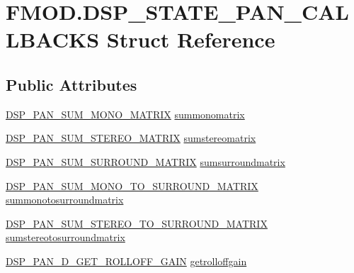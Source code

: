 \hypertarget{struct_f_m_o_d_1_1_d_s_p___s_t_a_t_e___p_a_n___c_a_l_l_b_a_c_k_s}{}\section{F\+M\+O\+D.\+D\+S\+P\+\_\+\+S\+T\+A\+T\+E\+\_\+\+P\+A\+N\+\_\+\+C\+A\+L\+L\+B\+A\+C\+KS Struct Reference}
\label{struct_f_m_o_d_1_1_d_s_p___s_t_a_t_e___p_a_n___c_a_l_l_b_a_c_k_s}
\subsection*{Public Attributes}
\begin{DoxyCompactItemize}
\item 
\hyperlink{namespace_f_m_o_d_af0cf7d431580d7f008accba401bd67be}{D\+S\+P\+\_\+\+P\+A\+N\+\_\+\+S\+U\+M\+\_\+\+M\+O\+N\+O\+\_\+\+M\+A\+T\+R\+IX} \hyperlink{struct_f_m_o_d_1_1_d_s_p___s_t_a_t_e___p_a_n___c_a_l_l_b_a_c_k_s_a159690b42e72855ed3ef3e6c2071f1cf}{summonomatrix}
\item 
\hyperlink{namespace_f_m_o_d_ac397f0f8014a6625c3810a9af4b4b9e7}{D\+S\+P\+\_\+\+P\+A\+N\+\_\+\+S\+U\+M\+\_\+\+S\+T\+E\+R\+E\+O\+\_\+\+M\+A\+T\+R\+IX} \hyperlink{struct_f_m_o_d_1_1_d_s_p___s_t_a_t_e___p_a_n___c_a_l_l_b_a_c_k_s_ace804227c9336d37481df37928d825c9}{sumstereomatrix}
\item 
\hyperlink{namespace_f_m_o_d_a9dda121ba9ef7b93f94aae821fafc709}{D\+S\+P\+\_\+\+P\+A\+N\+\_\+\+S\+U\+M\+\_\+\+S\+U\+R\+R\+O\+U\+N\+D\+\_\+\+M\+A\+T\+R\+IX} \hyperlink{struct_f_m_o_d_1_1_d_s_p___s_t_a_t_e___p_a_n___c_a_l_l_b_a_c_k_s_a93d192a2ac2ff9f9a5331d853c68cd57}{sumsurroundmatrix}
\item 
\hyperlink{namespace_f_m_o_d_a85ae3625db22d49858de03963b6fa9e2}{D\+S\+P\+\_\+\+P\+A\+N\+\_\+\+S\+U\+M\+\_\+\+M\+O\+N\+O\+\_\+\+T\+O\+\_\+\+S\+U\+R\+R\+O\+U\+N\+D\+\_\+\+M\+A\+T\+R\+IX} \hyperlink{struct_f_m_o_d_1_1_d_s_p___s_t_a_t_e___p_a_n___c_a_l_l_b_a_c_k_s_a479883215c4eb7802d04309dc656fc25}{summonotosurroundmatrix}
\item 
\hyperlink{namespace_f_m_o_d_a552eb6c162f571ad693744be6349786a}{D\+S\+P\+\_\+\+P\+A\+N\+\_\+\+S\+U\+M\+\_\+\+S\+T\+E\+R\+E\+O\+\_\+\+T\+O\+\_\+\+S\+U\+R\+R\+O\+U\+N\+D\+\_\+\+M\+A\+T\+R\+IX} \hyperlink{struct_f_m_o_d_1_1_d_s_p___s_t_a_t_e___p_a_n___c_a_l_l_b_a_c_k_s_adffb9c327a81855201bf6a40a3a11b71}{sumstereotosurroundmatrix}
\item 
\hyperlink{namespace_f_m_o_d_a04006b2279f2b4620e287a94e50ed6c8}{D\+S\+P\+\_\+\+P\+A\+N\+\_\+D\+\_\+\+G\+E\+T\+\_\+\+R\+O\+L\+L\+O\+F\+F\+\_\+\+G\+A\+IN} \hyperlink{struct_f_m_o_d_1_1_d_s_p___s_t_a_t_e___p_a_n___c_a_l_l_b_a_c_k_s_ac565bdb8669e39f3bc5a3d948a475dd1}{getrolloffgain}
\end{DoxyCompactItemize}


